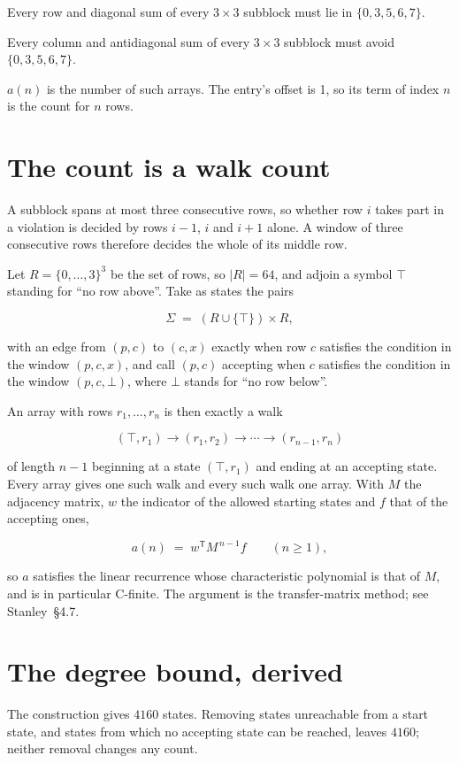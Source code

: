 \documentclass[11pt]{article}
\theoremstyle{definition}
\begin{document}
Every row and diagonal sum of every $3\times3$ subblock must lie in $\{0, 3, 5, 6, 7\}$.

Every column and antidiagonal sum of every $3\times3$ subblock must avoid $\{0, 3, 5, 6, 7\}$.

$a(n)$ is the number of such arrays. The entry's offset is 1, so its term of index $n$ is the count for $n$ rows.

\section{The count is a walk count}

A subblock spans at most three consecutive rows, so whether row $i$ takes part in a violation is decided by rows $i-1$, $i$ and $i+1$ alone. A window of three consecutive rows therefore decides the whole of its middle row.

Let $R = \{0,\dots,3\}^{3}$ be the set of rows, so $|R| = 64$, and adjoin a symbol $\top$ standing for ``no row above''. Take as states the pairs

\[\Sigma \;=\; (R \cup \{\top\}) \times R,\]

with an edge from $(p,c)$ to $(c,x)$ exactly when row $c$ satisfies the condition in the window $(p,c,x)$, and call $(p,c)$ accepting when $c$ satisfies the condition in the window $(p,c,\bot)$, where $\bot$ stands for ``no row below''.

An array with rows $r_1,\dots,r_n$ is then exactly a walk

\[(\top,r_1) \to (r_1,r_2) \to \cdots \to (r_{n-1},r_n)\]

of length $n-1$ beginning at a state $(\top,r_1)$ and ending at an accepting state. Every array gives one such walk and every such walk one array. With $M$ the adjacency matrix, $w$ the indicator of the allowed starting states and $f$ that of the accepting ones,

\[a(n) \;=\; w^{\mathsf T} M^{\,n-1} f \qquad (n \ge 1),\]

so $a$ satisfies the linear recurrence whose characteristic polynomial is that of $M$, and is in particular C-finite. The argument is the transfer-matrix method; see Stanley~\S4.7.

\section{The degree bound, derived}

The construction gives $4160$ states. Removing states unreachable from a start state, and states from which no accepting state can be reached, leaves $4160$; neither removal changes any count.
\end{document}

